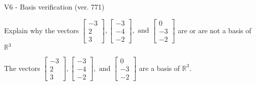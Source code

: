 \begin{exercise}
  \begin{exerciseTitle}V6 - Basis verification (ver. 771)\end{exerciseTitle}
  \begin{exerciseStatement}
    Explain why the vectors \(\left[\begin{array}{r}
-3 \\
2 \\
3
\end{array}\right] , \left[\begin{array}{r}
-3 \\
-4 \\
-2
\end{array}\right] , \text{ and } \left[\begin{array}{r}
0 \\
-3 \\
-2
\end{array}\right]\) are or are not a basis of \(\mathbb{R}^3\)	


  \end{exerciseStatement}
  \begin{exerciseAnswer}
   The vectors \(\left[\begin{array}{r}
-3 \\
2 \\
3
\end{array}\right] , \left[\begin{array}{r}
-3 \\
-4 \\
-2
\end{array}\right] , \text{ and } \left[\begin{array}{r}
0 \\
-3 \\
-2
\end{array}\right]\) 
  	 are  a basis of \(\mathbb{R}^3\).
  


  \end{exerciseAnswer}
\end{exercise}